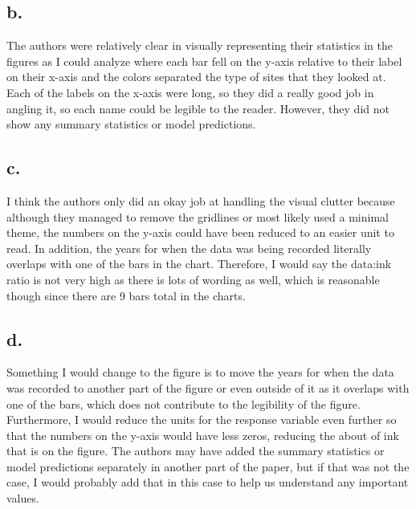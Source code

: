 \documentclass[
  letterpaper,
  DIV=11,
  numbers=noendperiod]{scrartcl}
\begin{document}
\subsection{b.}\label{b.-3}

The authors were relatively clear in visually representing their
statistics in the figures as I could analyze where each bar fell on the
y-axis relative to their label on their x-axis and the colors separated
the type of sites that they looked at. Each of the labels on the x-axis
were long, so they did a really good job in angling it, so each name
could be legible to the reader. However, they did not show any summary
statistics or model predictions.

\subsection{c.}\label{c.-2}

I think the authors only did an okay job at handling the visual clutter
because although they managed to remove the gridlines or most likely
used a minimal theme, the numbers on the y-axis could have been reduced
to an easier unit to read. In addition, the years for when the data was
being recorded literally overlaps with one of the bars in the chart.
Therefore, I would say the data:ink ratio is not very high as there is
lots of wording as well, which is reasonable though since there are 9
bars total in the charts.

\subsection{d.}\label{d.-2}

Something I would change to the figure is to move the years for when the
data was recorded to another part of the figure or even outside of it as
it overlaps with one of the bars, which does not contribute to the
legibility of the figure. Furthermore, I would reduce the units for the
response variable even further so that the numbers on the y-axis would
have less zeros, reducing the about of ink that is on the figure. The
authors may have added the summary statistics or model predictions
separately in another part of the paper, but if that was not the case, I
would probably add that in this case to help us understand any important
values.
\end{document}
